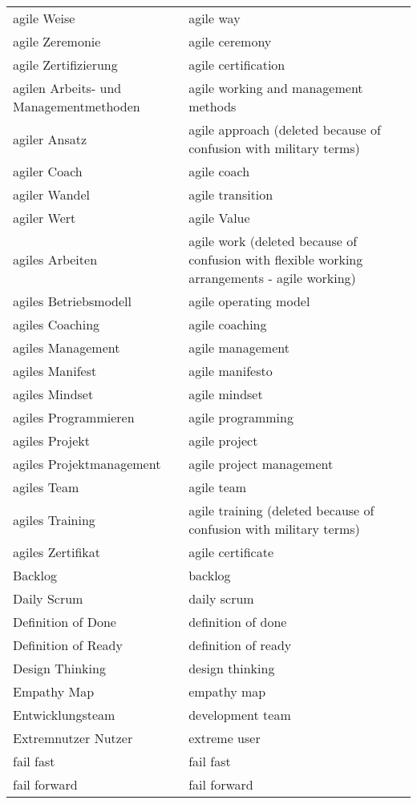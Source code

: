 \begin{spacing}{.5}
\begin{longtable}{ p{} p{}}
    agile Weise & agile way \\
    agile Zeremonie & agile ceremony \\
    agile Zertifizierung & agile certification \\
    agilen Arbeits- und Managementmethoden & agile working and management methods \\
    agiler Ansatz & agile approach (deleted because of confusion with military terms) \\
    agiler Coach & agile coach \\
    agiler Wandel & agile transition \\
    agiler Wert & agile Value \\
    agiles Arbeiten & agile work (deleted because of confusion with flexible working arrangements - agile working) \\
    agiles Betriebsmodell & agile operating model \\
    agiles Coaching & agile coaching \\
    agiles Management & agile management \\
    agiles Manifest & agile manifesto \\
    agiles Mindset & agile mindset \\
    agiles Programmieren & agile programming \\
    agiles Projekt & agile project \\
    agiles Projektmanagement & agile project management \\
    agiles Team & agile team \\
    agiles Training & agile training (deleted because of confusion with military terms) \\
    agiles Zertifikat & agile certificate \\
    Backlog & backlog \\
    Daily Scrum & daily scrum \\
    Definition of Done & definition of done \\
    Definition of Ready & definition of ready \\
    Design Thinking & design thinking \\
    Empathy Map & empathy map \\
    Entwicklungsteam & development team \\
    Extremnutzer Nutzer & extreme user \\
    fail fast & fail fast \\
    fail forward & fail forward \\

\end{longtable}
\end{spacing}
